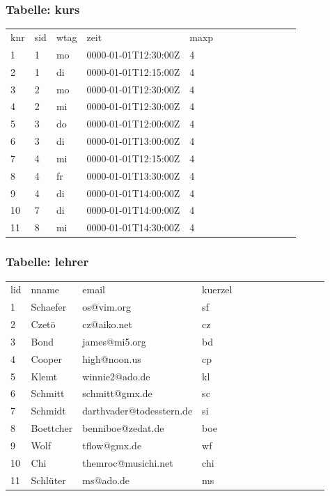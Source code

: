 \documentclass[fleqn]{scrartcl}
\begin{document}
\subsubsection{Tabelle: kurs}
\begin{tabular}{|l|l|l|l|l|l|l|l|l|l|l|l|l|}\toprule
\rowcolor{green!20}
\multicolumn{5}{|c|}{
kurs
}\\\midrule
\rowcolor{yellow!30}knr & sid  & wtag  & zeit  & maxp  \\\midrule
1& 1 & mo & 0000-01-01T12:30:00Z & 4  \\ 
2& 1 & di & 0000-01-01T12:15:00Z & 4  \\ 
3& 2 & mo & 0000-01-01T12:30:00Z & 4  \\ 
4& 2 & mi & 0000-01-01T12:30:00Z & 4  \\ 
5& 3 & do & 0000-01-01T12:00:00Z & 4  \\ 
6& 3 & di & 0000-01-01T13:00:00Z & 4  \\ 
7& 4 & mi & 0000-01-01T12:15:00Z & 4  \\ 
8& 4 & fr & 0000-01-01T13:30:00Z & 4  \\ 
9& 4 & di & 0000-01-01T14:00:00Z & 4  \\ 
10& 7 & di & 0000-01-01T14:00:00Z & 4  \\ 
11& 8 & mi & 0000-01-01T14:30:00Z & 4  \\ 
\bottomrule
\end{tabular}

\subsubsection{Tabelle: lehrer}
\begin{tabular}{|l|l|l|l|l|l|l|l|l|l|l|l|l|}\toprule
\rowcolor{green!20}
\multicolumn{4}{|c|}{
lehrer
}\\\midrule
\rowcolor{yellow!30}lid & nname  & email  & kuerzel  \\\midrule
1& Schaefer & os@vim.org & sf  \\ 
2& Czetö & cz@aiko.net & cz  \\ 
3& Bond & james@mi5.org & bd  \\ 
4& Cooper & high@noon.us & cp  \\ 
5& Klemt & winnie2@ado.de & kl  \\ 
6& Schmitt & schmitt@gmx.de & sc  \\ 
7& Schmidt & darthvader@todesstern.de & si  \\ 
8& Boettcher & benniboe@zedat.de & boe  \\ 
9& Wolf & tflow@gmx.de & wf  \\ 
10& Chi & themroc@musichi.net & chi  \\ 
11& Schlüter & ms@ado.de & ms  \\ 
\bottomrule
\end{tabular}
\end{document}
